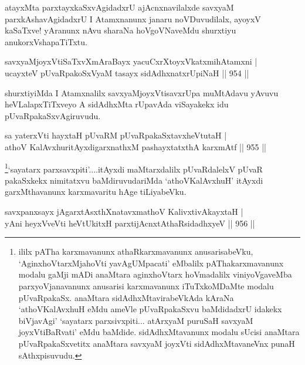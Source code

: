 \begin{artha}
atayxMta parxtayxkaSxvAgidadxrU ajAcnxnavilalxde savxyaM parxkAshavAgidadxrU I Atamxnanunx janaru noVDuvudilalx, ayoyxV kaSaTxve! yAranunx nAvu sharaNa hoVgoVNaveMdu shurxtiyu anukorxVshapaTiTxtu.
\end{artha}


\begin{shl}
savxyaMjoyxVtiSaTxvXmAraBayx yacuCxrXtoyxVkatxmihA\s \s tamxni | \\
ucayxteV pUvaRpakoSxV\s yaM tasayx sidAdhxnatxrUpiNaH \hfill||  954 ||  
\end{shl}

\begin{artha}
shurxtiyiMda I Atamxnalilx savxyaMjoyxVtisavxrUpa muMtAdavu yAvuvu heVLalapxTiTxveyo A sidAdhxMta rUpavAda viSayakekx idu pUvaRpakaSxvAgiruvudu.
\end{artha}


\begin{shl}
sa yaterxVti hayxtaH pUvaRM pUvaRpakaSxtavxheVtutaH | \\
athoV KalAvxhuritAyxdigarxnathxM pashayxtatxthA karxmAtf \hfill||  955 ||  
\end{shl}

\begin{artha}
\footnote{ililx pATha karxmavanunx athaRkarxmavanunx anusarisabeVku, `AginxhoVtarxMjahoVti yavAgUMpacati' eMbalilx pAThakarxmavanunx modalu gaMji mADi anaMtara aginxhoVtarx hoVmadalilx  viniyoVgaveMba parxyoVjanavanunx anusarisi karxmavanunx iTuTxkoMDaMte modalu pUvaRpakaSx. anaMtara sidAdhxMtavirabeVkAda kAraNa `athoVKalAvxhuH eMdu ameVle pUvaRpakaSxvu baMdidadxrU idakekx biVjavAgi'  `sayatarx parxsivxpiti... atArxyaM puruSaH savxyaM joyxVtiBaRvati' eMdu baMdide. sidAdhxMtavanunx modalu sUcisi anaMtara pUvaRpakaSxvetitx anaMtara savxyaM joyxVti sidAdhxMtavaneVnx punaH sAthxpisuvudu.}`sayatarx parxsavxpiti'....itAyxdi maMtarxdalilx pUvaRdalelxV pUvaR pakaSxkekx nimitatxvu baMdiruvudariMda `athoVKalAvxhuH' itAyxdi garxMthavanunx karxmavaritu hAge tiLiyabeVku.
\end{artha}


\begin{shl}
savxpanxsayx jAgarxtAsxthXnatavxmathoV KalivxtivAkayxtaH | \\
yAni heyxVveVti heVtUkitxH parxtijAcnxtAthaRsidadhxyeV \hfill||  956 ||  
\end{shl}

